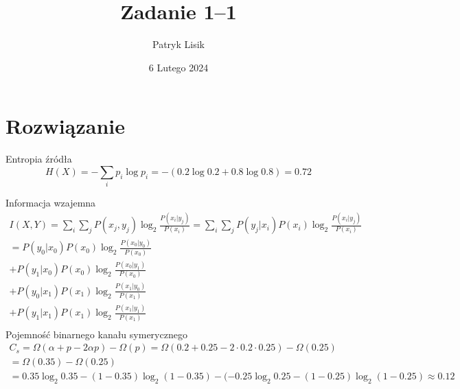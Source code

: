 \documentclass[12pt]{article}
\title{Zadanie 1--1}
\author{Patryk Lisik}
\date{\(6\) Lutego  2024}
\begin{document}
    \maketitle
    \renewcommand{\abstractname}{Treść}

    \begin{abstract}
    \end{abstract}


    \section*{Rozwiązanie}

    Entropia źródła
    \begin{equation*}
        H(X) = -\sum_i p_i \log p_i = -(0.2 \log 0.2 + 0.8 \log 0.8) = 0.72
    \end{equation*}

    Informacja wzajemna
    \begin{multline*}
        I(X,Y)  = \sum_{i}\sum_j P(x_j,y_j)\log_2 \frac{P(x_i|y_j)}{P(x_i)}
        = \sum_{i}\sum_j P(y_j|x_i)P(x_i)\log_2 \frac{P(x_i|y_j)}{P(x_i)} \\
        = P(y_0|x_0)P(x_0)\log_2 \frac{P(x_0|y_0)}{P(x_0)} \\
        + P(y_1|x_0)P(x_0)\log_2 \frac{P(x_0|y_1)}{P(x_0)} \\
        + P(y_0|x_1)P(x_1)\log_2 \frac{P(x_1|y_0)}{P(x_1)} \\
        + P(y_1|x_1)P(x_1)\log_2 \frac{P(x_1|y_1)}{P(x_1)} \\
    \end{multline*}
Pojemność binarnego kanału symerycznego
    \begin{multline*}
    C_s = \Omega(\alpha + p - 2\alpha p) - \Omega (p) = \Omega(0.2+0.25 - 2 \cdot 0.2 \cdot 0.25)-\Omega(0.25) \\
        = \Omega(0.35)-\Omega(0.25) \\
        = 0.35 \log_2 0.35 - (1-0.35) \log_2(1-0.35) -(-0.25\log_2 0.25 - (1-0.25)\log_2(1-0.25) \approx 0.12 
\end{multline*}
    
\end{document}
